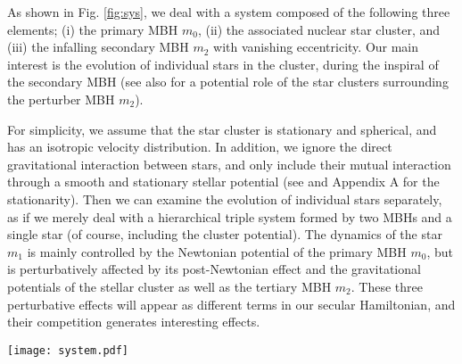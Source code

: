 \documentclass[useAMS,usenatbib,twocolumn]{mn2e}
\begin{document}
As shown in Fig. \ref{fig:sys}, we deal with a system composed
of the following three elements; (i) the primary MBH $m_0$, (ii)
the associated nuclear star cluster, and (iii) the infalling secondary MBH
$m_{2}$  with
vanishing eccentricity. Our main interest is the evolution of individual stars
in the cluster, during the inspiral of the secondary MBH  (see also \citealt{merritt2013} for a potential role of the star clusters surrounding the perturber MBH $m_2$).




For simplicity, we assume that the star cluster is stationary and  spherical, and has
 an isotropic velocity distribution. In addition, we ignore
the direct gravitational interaction between stars, and only
include their mutual interaction through a smooth and stationary stellar
potential (see \cite{iwasa2016} and Appendix A for the stationarity).
Then we can  examine the evolution of individual stars separately, as
if we merely deal with a hierarchical triple system formed by two 
MBHs and a single star (of course, including the
cluster potential).  The dynamics of the star $m_1$ is mainly controlled by
the Newtonian potential of the primary MBH $m_0$, but is perturbatively affected 
by its post-Newtonian effect and the gravitational potentials of the stellar cluster   
as well as the tertiary MBH $m_2$.  These three perturbative effects will appear
as different terms in our secular Hamiltonian, and their competition generates
interesting effects.



\begin{figure*}
\begin{center}
\texttt{[image: system.pdf]}
\caption{Configuration of our system. A star $m_1$ moves around
the primary MBH $m_0(\gg m_1)$, perturbatively affected by (i) the  1PN effect of the primary MBH $m_0$ and 
(ii) the gravitational potential of the nuclear star cluster and (iii) the tidal field of the tertiary MBH $m_2$.
 We denote its orbital elements by $a_1$ (the
semimajor axis) and $e_1$ (the eccentricity). The secondary MBH
$m_2$ slowly inspirals to the primary MBH with vanishing
eccentricity $e_2=0$. The parameter $I$ represents the
inclination between the inner and outer orbits.
 The subscripts 1 and 2 denote the
inner and outer orbital parameters.
}
\label{fig:sys}
\end{center}
\end{figure*}
\end{document}
